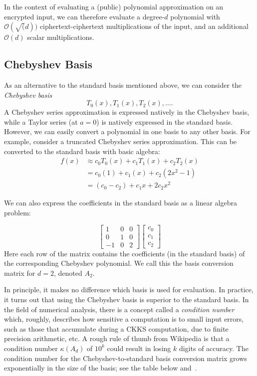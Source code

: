 \documentclass[../fheimpl.tex]{subfiles}
\begin{document}
	In the context of evaluating a (public) polynomial approximation on an encrypted input, we can therefore evaluate a degree-$d$ polynomial with $\mathcal{O}(\sqrt(d))$ ciphertext-ciphertext multiplications of the input, and an additional $\mathcal{O}(d)$  scalar multiplications.
	
	\subsection{Chebyshev Basis}
	As an alternative to the standard basis mentioned above, we can consider the \emph{Chebyshev basis} \[{T_0(x), T_1(x), T_2(x), \ldots}.\] A Chebyshev series approximation is expressed natively in the Chebyshev basis, while a Taylor series (at $a=0$) is natively expressed in the standard basis. However, we can easily convert a polynomial in one basis to any other basis. For example, consider a truncated Chebyshev series approximation. This can be converted to the standard basis with basic algebra:
	\begin{align*}
		f(x) & \approx c_0T_0(x) + c_1T_1(x) + c_2T_2(x) \\
		& = c_0(1) + c_1(x) + c_2(2x^2-1) \\
		& = (c_0-c_2) + c_1x + 2c_2x^2
	\end{align*}
	
	We can also express the coefficients in the standard basis as a linear algebra problem:
	
	\[
	\begin{bmatrix}
		1       & 0 & 0 \\
		0       & 1 & 0 \\
		-1      & 0 & 2
	\end{bmatrix}
	\begin{bmatrix}
		c_0 \\
		c_1 \\
		c_2
	\end{bmatrix}
	\]
	Here each row of the matrix contains the coefficients (in the standard basis) of the corresponding Chebyshev polynomial. We call this the basis conversion matrix for $d=2$, denoted $A_2$.
	
	In principle, it makes no difference which basis is used for evaluation. In practice, it turns out that using the Chebyshev basis is superior to the standard basis. In the field of numerical analysis, there is a concept called a \emph{condition number} which, roughly, describes how sensitive a computation is to small input errors, such as those that accumulate during a CKKS computation, due to finite precision arithmetic, etc. A rough rule of thumb from Wikipedia is that a condition number $\kappa(A_d)$ of $10^k$ could result in losing $k$ digits of accuracy. The condition number for the Chebyshev-to-standard basis conversion matrix grows exponentially in the size of the basis; see the table below and~\cite{conditionnum}.
	
\end{document}
